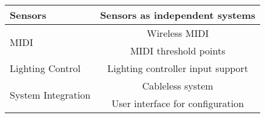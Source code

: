     \begin{tabular}{|l|c|}
        \hline
        Sensors                               & \cellcolor{red!25}Sensors as independent systems        \\ \hline \hline
        \multirow{2}{7em}{MIDI}               & \cellcolor{red!25}Wireless MIDI                         \\ \cline{2-2}
        ~                                     & \cellcolor{red!25}MIDI threshold points                 \\ \hline \hline
        Lighting Control                      & \cellcolor{red!25}Lighting controller input support     \\ \hline \hline
        \multirow{2}{7em}{System Integration} & \cellcolor{red!25}Cableless system                      \\ \cline{2-2}
        ~                                     & \cellcolor{red!25}User interface for configuration      \\ \hline
    \end{tabular}

